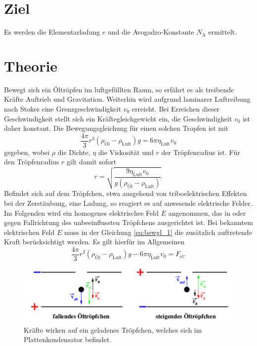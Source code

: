 \section*{Ziel}

Es werden die Elementarladung $e$  und die Avogadro-Konstante $N_\text{A}$ ermittelt.
\section{Theorie}
\label{sec:Theorie}

Bewegt sich ein Öltröpfen im luftgefüllten Raum, so erfährt es als treibende Kräfte Auftrieb und Gravitation.
Weiterhin wird aufgrund laminarer Luftreibung nach Stokes eine Grenzgeschwindigkeit $v_0$ erreicht.
Bei Erreichen dieser Geschwindigkeit stellt sich ein Kräftegleichgewicht ein,
die Geschwindigkeit $v_0$ ist daher konstant.
Die Bewegungsgleichung für einen solchen Tropfen ist mit
\begin{equation}
	\frac{4\pi}{3}r^3(\rho_\text{Öl}-\rho_\text{Luft})g=6\pi\eta_\text{Luft}v_0
	\label{eq:bewgl_1}
\end{equation}
gegeben, wobei $\rho$ die Dichte, $\eta$ die Viskosität und $r$ der Tröpfenradius ist.
Für den Tröpfenradius $r$ gilt damit sofort
\begin{equation}
	r=\sqrt{\frac{9\eta_\text{Luft}v_0}{g(\rho_\text{Öl}-\rho_\text{Luft})}}.
	\label{eq:radius_v0}
\end{equation}
Befindet sich auf dem Tröpfchen, etwa ausgehend von triboelektrischen Effekten bei der Zerstäubung,
eine Ladung, so reagiert es auf anwesende elektrische Felder.
Im Folgenden wird ein homogenes elektrisches Feld $E$ angenommen, das in oder gegen Fallrichtung des unbeeinflussten Tröpfchens ausgerichtet ist. %
Bei bekanntem elektrischen Feld $E$ muss in der Gleichung \ref{eq:bewgl_1} die zusätzlich auftretende Kraft berücksichtigt werden.
Es gilt hierfür im Allgemeinen
\begin{equation}
	\frac{4\pi}{3}r^3(\rho_\text{Öl}-\rho_\text{Luft})g-6\pi\eta_\text{Luft}v_0= F_\text{el}.
	\label{eq:bewgl_2a}
\end{equation}


\begin{figure}
	\centering
	\includegraphics[width=\textwidth]{Bilder/Tropfen.pdf}
	\caption{Kräfte wirken auf ein geladenes Tröpfchen, welches sich im Plattenkondensator befindet.}
	\label{fig:tropfen}
\end{figure}



